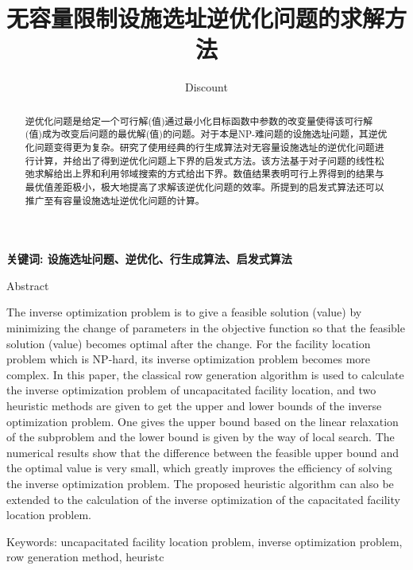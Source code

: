 \documentclass[UTF8]{article}
\author {Dis\cdot count}
\title {无容量限制设施选址逆优化问题的求解方法}
\date{}
\begin{document}
    \maketitle

\begin{abstract}
逆优化问题是给定一个可行解(值)通过最小化目标函数中参数的改变量使得该可行解(值)成为改变后问题的最优解(值)的问题。对于本是NP-难问题的设施选址问题，其逆优化问题变得更为复杂。研究了使用经典的行生成算法对无容量设施选址的逆优化问题进行计算，并给出了得到逆优化问题上下界的启发式方法。该方法基于对子问题的线性松弛求解给出上界和利用邻域搜索的方式给出下界。数值结果表明可行上界得到的结果与最优值差距极小，极大地提高了求解该逆优化问题的效率。所提到的启发式算法还可以推广至有容量设施选址逆优化问题的计算。

\end{abstract}

\qquad \textbf{关键词: 设施选址问题、逆优化、行生成算法、启发式算法}

Abstract

The inverse optimization problem is to give a feasible solution (value) by minimizing the change of parameters in the objective function so that the feasible solution (value) becomes optimal after the change. For the facility location problem which is NP-hard, its inverse optimization problem becomes more complex. In this paper, the classical row generation algorithm is used to calculate the inverse optimization problem of uncapacitated facility location, and two heuristic methods are given to get the upper and lower bounds of the inverse optimization problem. One gives the upper bound based on the linear relaxation of the subproblem and the lower bound is given by the way of local search. The numerical results show that the difference between the feasible upper bound and the optimal value is very small, which greatly improves the efficiency of solving the inverse optimization problem. The proposed heuristic algorithm can also be extended to the calculation of the inverse optimization of the capacitated facility location problem.

Keywords: uncapacitated facility location problem, inverse optimization problem, row generation method, heuristc
\end{document}
